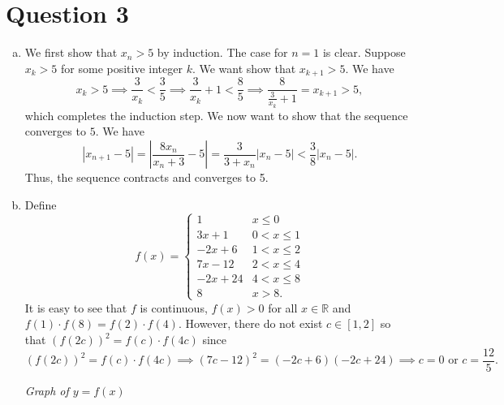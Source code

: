 \documentclass{article}
\begin{document}
\section*{Question 3}
\begin{enumerate}[(a)]
    \item We first show that $x_n>5$ by induction. The case for $n=1$ is clear. Suppose $x_k>5$ for some positive integer $k.$ We want show that $x_{k+1}>5.$ We have $$x_k>5\implies \frac{3}{x_k}<\frac{3}{5}\implies \frac{3}{x_k}+1<\frac{8}{5}\implies\frac{8}{\frac{3}{x_k}+1}=x_{k+1}>5,$$ which completes the induction step. We now want to show that the sequence converges to $5.$ We have $$|x_{n+1}-5|=\left|\frac{8x_n}{x_n+3}-5\right|=\frac{3}{3+x_n}\left|x_n-5\right|<\frac{3}{8}|x_n-5|.$$ Thus, the sequence contracts and converges to 5.
    \item Define $$f(x)=\begin{cases}
    1&x\leq 0\\
    3x+1&0<x\leq1\\
    -2x+6&1<x\leq2\\
    7x-12&2<x\leq4\\
    -2x+24&4<x\leq8\\
    8&x>8.
    \end{cases}$$
    It is easy to see that $f$ is continuous, $f(x)>0$ for all $x\in\mathbb{R}$ and $f(1)\cdot f(8)=f(2)\cdot f(4).$ However, there do not exist $c\in[1,2]$ so that $(f(2c))^2=f(c)\cdot f(4c)$ since $$(f(2c))^2=f(c)\cdot f(4c)\implies (7c-12)^2=(-2c+6)(-2c+24)\implies c=0\text{ or }c=\frac{12}{5}.$$
    
\begin{center}
    \textit{Graph of $y=f(x)$}
\end{center}
\end{enumerate}
\end{document}
